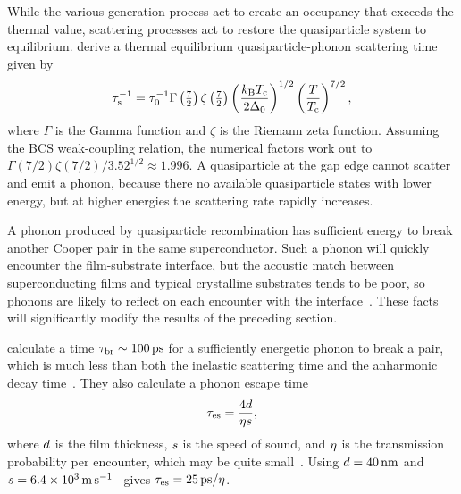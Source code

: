While the various generation process act to create an occupancy that exceeds the thermal value, scattering processes act to restore the quasiparticle system to equilibrium.
\textcite{Kaplan1976PRB} derive a thermal equilibrium quasiparticle-phonon scattering time given by
\begin{equation}
\tau_\mathrm{s}^{-1}
  =
  \tau_0^{-1} \Gamma \left(\tfrac{7}{2}\right) \zeta \left(\tfrac{7}{2}\right) \left( \frac{k_\mathrm{B} T_{\mathrm{c}}}{2 \Delta_0} \right)^{1/2} \left( \frac{T}{T_{\mathrm{c}}} \right)^{7/2},
\label{eqn:electron-phonon_scattering}
\end{equation}
where $\Gamma$ is the Gamma function and $\zeta$ is the Riemann zeta function.
Assuming the BCS weak-coupling relation, the numerical factors work out to
$\Gamma (7 / 2) \zeta (7 / 2) / 3.52^{1/2} \approx 1.996$.
A quasiparticle at the gap edge cannot scatter and emit a phonon, because there no available quasiparticle states with lower energy, but at higher energies the scattering rate rapidly increases.

A phonon produced by quasiparticle recombination has sufficient energy to break another Cooper pair in the same superconductor.
Such a phonon will quickly encounter the film-substrate interface, but the acoustic match between superconducting films and typical crystalline substrates tends to be poor, so phonons are likely to reflect on each encounter with the  interface~\autocite{Kaplan1979JLTP}.
These facts will significantly modify the results of the preceding section.

\textcite{Chang1978JLTP} calculate a time
$\tau_\mathrm{br} \sim \SI{100}{ps}$
for a sufficiently energetic phonon to break a pair, which is much less than both the inelastic scattering time and the anharmonic decay time~\autocite{Kozorezov2000PRB}.
They also calculate a phonon escape time
\begin{equation}
\tau_\mathrm{es}
  =
  \frac{4 d}{\eta s},
\label{eqn:phononescapetime}
\end{equation}
where $d$ is the film thickness, $s$ is the speed of sound, and $\eta$ is the transmission probability per encounter, which may be quite small~\autocite{Kaplan1979JLTP}.
Using
$d = \SI{40}{nm}$
and
$s = \SI{6.4e3}{m.s^{-1}}$~\autocite{Chang1978JLTP}
gives
$\tau_\mathrm{es} = \SI{25}{ps} / \eta$.

